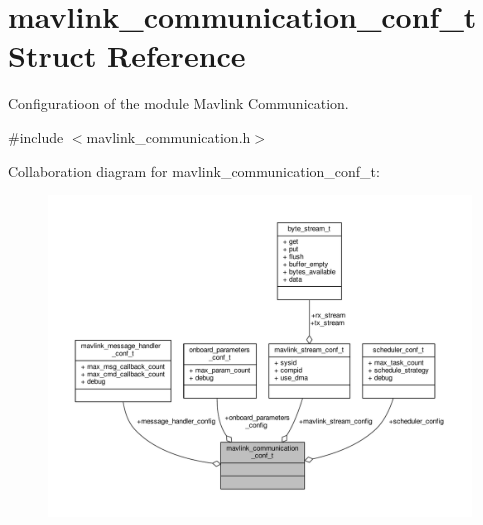 \hypertarget{structmavlink__communication__conf__t}{\section{mavlink\+\_\+communication\+\_\+conf\+\_\+t Struct Reference}
\label{structmavlink__communication__conf__t}
}


Configuratioon of the module Mavlink Communication.  




{\ttfamily \#include $<$mavlink\+\_\+communication.\+h$>$}



Collaboration diagram for mavlink\+\_\+communication\+\_\+conf\+\_\+t\+:
\nopagebreak
\begin{figure}[H]
\begin{center}
\leavevmode
\includegraphics[width=350pt]{structmavlink__communication__conf__t__coll__graph}
\end{center}
\end{figure}
